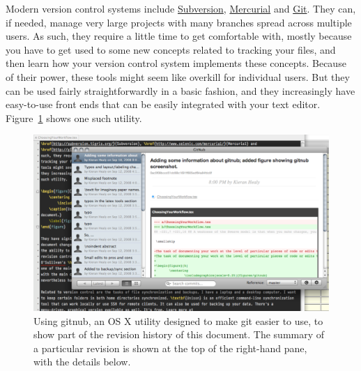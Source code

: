 \documentclass[11pt,article,oneside]{memoir}
\begin{document}
Modern version control systems include \href{http://subversion.tigris.org/}{Subversion}, \href{http://www.selenic.com/mercurial/}{Mercurial} and \href{http://git.or.cz/}{Git}. They can, if needed, manage very large projects with many branches spread across multiple users. As such, they require a little time to get comfortable with, mostly because you have to get used to some new concepts related to tracking your files, and then learn how your version control system implements these concepts. Because of their power, these tools might seem like overkill for individual users. But they can be used fairly straightforwardly in a basic fashion, and they increasingly have easy-to-use front ends that can be easily integrated with your text editor. Figure~\ref{fig:gitnub} shows one such utility.     

\begin{figure}[h]
	\centering
		\includegraphics[scale=0.33]{figures/gitnub}
	\caption{Using gitnub, an OS X utility designed to make git easier to use, to show part of the revision history of this document. The summary of a particular revision is shown at the top of the right-hand pane, with the details below.}
	\label{fig:gitnub}
\end{figure}
\end{document}
